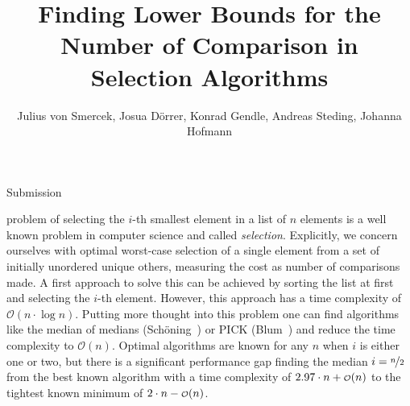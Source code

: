 \documentclass[10pt,journal,compsoc]{IEEEtran}
\newcommand\smallO{
  \mathchoice
    {{\scriptstyle\mathcal{O}}}%
    {{\scriptstyle\mathcal{O}}}%
    {{\scriptscriptstyle\mathcal{O}}}%
    {\scalebox{.50}{$\scriptscriptstyle\mathcal{O}$}}%
  }
\begin{document}
\title{Finding Lower Bounds for the Number of Comparison in Selection Algorithms}

\author{Julius von Smercek, Josua Dörrer, Konrad Gendle, Andreas Steding, Johanna Hofmann%
  }

%
{Submission}



\maketitle

\IEEEdisplaynontitleabstractindextext


\IEEEpeerreviewmaketitle

  problem of selecting the $i$-th smallest element in a list of $n$ elements is a well known problem in computer science and called \textit{selection}.
Explicitly, we concern ourselves with optimal worst-case selection of a single element from a set of initially unordered unique others, measuring the cost as number of comparisons made.
A first approach to solve this can be achieved by sorting the list at first and selecting the $i$-th element. However, this approach has a time complexity of $\mathcal{O}(n \cdot \log n)$.
Putting more thought into this problem one can find algorithms like the median of medians (Schöning~\cite{Schoening1993}) or PICK (Blum~\cite{Blum1972}) and reduce the time complexity to $\mathcal{O}(n)$.
Optimal algorithms are known for any $n$ when $i$ is either one or two, but there is a significant performance gap finding the median $i = \nicefrac{n}{2}$ from the best known algorithm with a time complexity of $2.97 \cdot n + \smallO(n)$ to the tightest known minimum of $2 \cdot n - \smallO(n)$.
\end{document}
